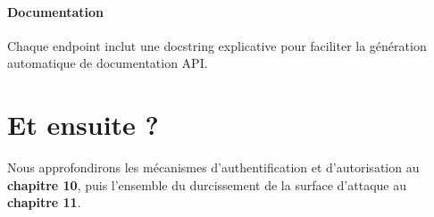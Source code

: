 \paragraph{Documentation} Chaque endpoint inclut une docstring explicative pour faciliter la génération automatique de documentation API.

\section*{Et ensuite ?}
Nous approfondirons les mécanismes d'authentification et d'autorisation au \textbf{chapitre 10}, puis l'ensemble du durcissement de la surface d'attaque au \textbf{chapitre 11}. 
